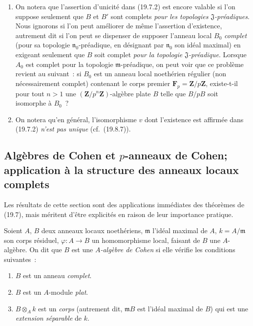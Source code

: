 \begin{remarks}[19.7.3]
\label{0.19.7.3-fr}
\begin{enumerate}
  \item[(i)] On notera que l'assertion d'unicité dans (19.7.2) est encore
  valable si l'on suppose seulement que $B$ et $B'$ sont complets \emph{pour
  les topologies $\mathfrak J$-préadiques}. Nous ignorons si l'on peut
  améliorer de même l'assertion d'existence, autrement dit si l'on peut se
  dispenser de supposer l'anneau local $B_0$ \emph{complet} (pour sa topologie
  $\mathfrak n_0$-préadique, en désignant par $\mathfrak n_0$ son idéal
  maximal) en exigeant seulement que $B$ soit complet \emph{pour la topologie
  $\mathfrak J$-préadique}. Lorsque $A_0$ est complet pour la topologie
  $\mathfrak m$-préadique, on peut voir que ce problème revient au suivant~:
  si $B_0$ est un anneau local noethérien régulier (non nécessairement
  complet) contenant le corps premier $\mathbf F_p=\mathbf Z/p\mathbf Z$,
  existe-t-il pour tout $n>1$ une $(\mathbf Z/p^n\mathbf Z)$-algèbre plate $B$
  telle que $B/pB$ soit isomorphe à $B_0$~?
  \item[(ii)] On notera qu'en général, l'isomorphisme $v$ dont l'existence est
  affirmée dans (19.7.2) \emph{n'est pas unique} (cf.~(19.8.7)).
\end{enumerate}
\end{remarks}

\subsection{Algèbres de Cohen et $p$-anneaux de Cohen; application à la
structure des anneaux locaux complets}
\label{subsection:0.19.8-fr}

Les résultats de cette section sont des applications immédiates des théorèmes
de (19.7), mais méritent d'être explicités en raison de leur importance
pratique.

\begin{definition}[19.8.1]
\label{0.19.8.1-fr}
Soient $A$, $B$ deux anneaux locaux noethériens, $\mathfrak m$ l'idéal maximal
de $A$, $k=A/\mathfrak m$ son corps résiduel,
$\varphi:A\to B$ un homomorphisme local, faisant de $B$ une $A$-algèbre. On
dit que $B$ est une \emph{$A$-algèbre de Cohen} si elle vérifie les conditions
suivantes~:
\begin{enumerate}
  \item[(i)] $B$ est un anneau \emph{complet}.
  \item[(ii)] $B$ est un $A$-module \emph{plat}.
  \item[(iii)] $B\otimes_A k$ est un \emph{corps} (autrement dit,
  $\mathfrak mB$ est l'idéal maximal de $B$) qui est une \emph{extension
  séparable} de $k$.
\end{enumerate}
\end{definition}

